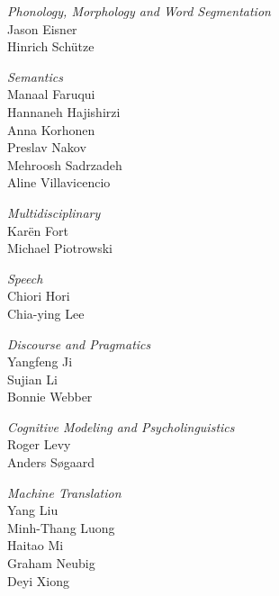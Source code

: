 \emph{Phonology, Morphology and Word Segmentation} \\
\hspace*{0.2in} Jason Eisner \\
\hspace*{0.2in} Hinrich Schütze

\emph{Semantics} \\
\hspace*{0.2in} Manaal Faruqui \\
\hspace*{0.2in} Hannaneh Hajishirzi \\
\hspace*{0.2in} Anna Korhonen \\
\hspace*{0.2in} Preslav Nakov \\
\hspace*{0.2in} Mehroosh Sadrzadeh \\
\hspace*{0.2in} Aline Villavicencio

\emph{Multidisciplinary} \\
\hspace*{0.2in} Karën Fort \\
\hspace*{0.2in} Michael Piotrowski

\emph{Speech} \\
\hspace*{0.2in} Chiori Hori \\
\hspace*{0.2in} Chia-ying Lee

\emph{Discourse and Pragmatics} \\
\hspace*{0.2in} Yangfeng Ji \\
\hspace*{0.2in} Sujian Li \\
\hspace*{0.2in} Bonnie Webber

\emph{Cognitive Modeling and Psycholinguistics} \\
\hspace*{0.2in} Roger Levy \\
\hspace*{0.2in} Anders Søgaard

\emph{Machine Translation} \\
\hspace*{0.2in} Yang Liu \\
\hspace*{0.2in} Minh-Thang Luong \\
\hspace*{0.2in} Haitao Mi \\
\hspace*{0.2in} Graham Neubig \\
\hspace*{0.2in} Deyi Xiong

